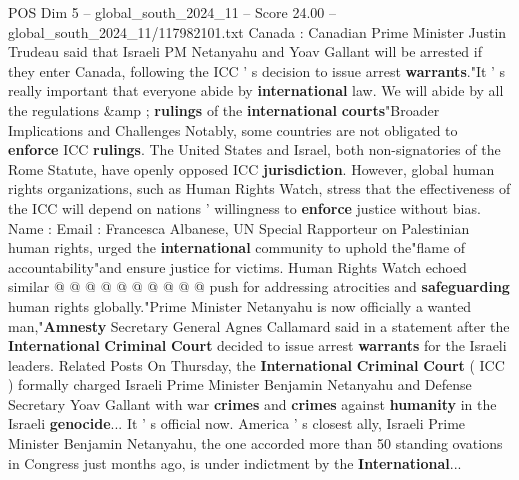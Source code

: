 \begin{textsample}{POS Dim 5 – global\_south\_2024\_11 – Score 24.00 – global\_south\_2024\_11/117982101.txt}
Canada : Canadian Prime Minister Justin Trudeau said that Israeli PM Netanyahu and Yoav Gallant will be arrested if they enter Canada, following the ICC ' s decision to issue arrest \textbf{warrants}."It ' s really important that everyone abide by \textbf{international} law.
We will abide by all the regulations \&amp ; \textbf{rulings} of the \textbf{international} \textbf{courts}"Broader Implications and Challenges Notably, some countries are not obligated to \textbf{enforce} ICC \textbf{rulings}.
The United States and Israel, both non-signatories of the Rome Statute, have openly opposed ICC \textbf{jurisdiction}.
However, global human rights organizations, such as Human Rights Watch, stress that the effectiveness of the ICC will depend on nations ' willingness to \textbf{enforce} justice without bias.
Name : Email : Francesca Albanese, UN Special Rapporteur on Palestinian human rights, urged the \textbf{international} community to uphold the"flame of accountability"and ensure justice for victims.
Human Rights Watch echoed similar @ @ @ @ @ @ @ @ @ @ push for addressing atrocities and \textbf{safeguarding} human rights globally."Prime Minister Netanyahu is now officially a wanted man,"\textbf{Amnesty} Secretary General Agnes Callamard said in a statement after the \textbf{International} \textbf{Criminal} \textbf{Court} decided to issue arrest \textbf{warrants} for the Israeli leaders.
Related Posts On Thursday, the \textbf{International} \textbf{Criminal} \textbf{Court} ( ICC ) formally charged Israeli Prime Minister Benjamin Netanyahu and Defense Secretary Yoav Gallant with war \textbf{crimes} and \textbf{crimes} against \textbf{humanity} in the Israeli \textbf{genocide}...
It ' s official now.
America ' s closest ally, Israeli Prime Minister Benjamin Netanyahu, the one accorded more than 50 standing ovations in Congress just months ago, is under indictment by the \textbf{International}...

\end{textsample}
